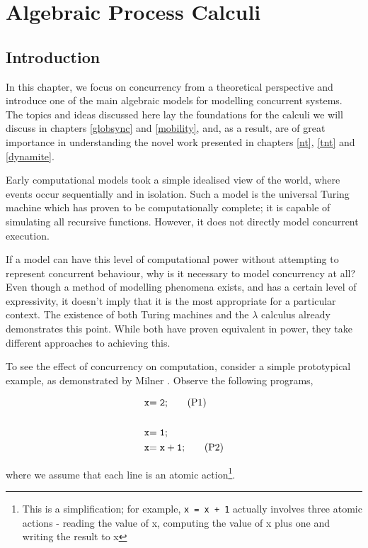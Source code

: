 
\chapter{Algebraic Process Calculi}
\label{apc}

\section{Introduction}

In this chapter, we focus on concurrency from a theoretical
perspective and introduce one of the main algebraic models for
modelling concurrent systems.  The topics and ideas discussed here lay
the foundations for the calculi we will discuss in chapters
\ref{globsync} and \ref{mobility}, and, as a result, are of great
importance in understanding the novel work presented in chapters
\ref{nt}, \ref{tnt} and \ref{dynamite}.

Early computational models took a simple idealised view of the world,
where events occur sequentially and in isolation.  Such a model is the
universal Turing machine \cite{turing:36} which has proven to be
computationally complete; it is capable of simulating all recursive
functions.  However, it does not directly model concurrent execution.

If a model can have this level of computational power without
attempting to represent concurrent behaviour, why is it necessary to
model concurrency at all?  Even though a method of modelling phenomena
exists, and has a certain level of expressivity, it doesn't imply that
it is the most appropriate for a particular context.  The existence of
both Turing machines and the $\lambda$ calculus already demonstrates
this point.  While both have proven equivalent in power, they take
different approaches to achieving this.

To see the effect of concurrency on computation, consider a simple
prototypical example, as demonstrated by Milner \cite{milner:lecture}.
Observe the following programs,

\begin{align*}
\mathtt{x} & \mathtt{= 2;}\tag{P1} \\
\\
\mathtt{x} & \mathtt{= 1;}\notag \\
\mathtt{x} & \mathtt{= x + 1;}\tag{P2}
\end{align*}

\noindent where we assume that each line is an atomic
action\footnote{This is a simplification; for example, \texttt{x = x +
    1} actually involves three atomic actions - reading the value of
  x, computing the value of x plus one and writing the result to x}.

